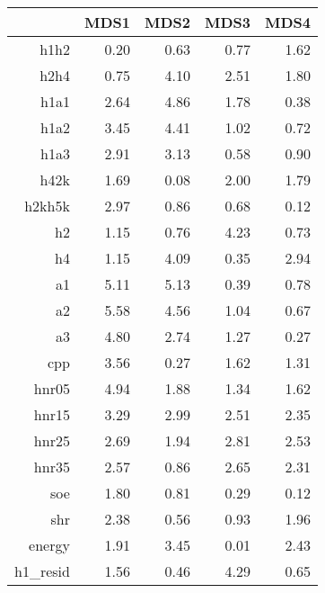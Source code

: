 \begin{table}[ht]
\centering
\begin{tabular}{rrrrr}
  \hline
 & MDS1 & MDS2 & MDS3 & MDS4 \\ 
  \hline
h1h2 & 0.20 & 0.63 & 0.77 & 1.62 \\ 
  h2h4 & 0.75 & 4.10 & 2.51 & 1.80 \\ 
  h1a1 & 2.64 & 4.86 & 1.78 & 0.38 \\ 
  h1a2 & 3.45 & 4.41 & 1.02 & 0.72 \\ 
  h1a3 & 2.91 & 3.13 & 0.58 & 0.90 \\ 
  h42k & 1.69 & 0.08 & 2.00 & 1.79 \\ 
  h2kh5k & 2.97 & 0.86 & 0.68 & 0.12 \\ 
  h2 & 1.15 & 0.76 & 4.23 & 0.73 \\ 
  h4 & 1.15 & 4.09 & 0.35 & 2.94 \\ 
  a1 & 5.11 & 5.13 & 0.39 & 0.78 \\ 
  a2 & 5.58 & 4.56 & 1.04 & 0.67 \\ 
  a3 & 4.80 & 2.74 & 1.27 & 0.27 \\ 
  cpp & 3.56 & 0.27 & 1.62 & 1.31 \\ 
  hnr05 & 4.94 & 1.88 & 1.34 & 1.62 \\ 
  hnr15 & 3.29 & 2.99 & 2.51 & 2.35 \\ 
  hnr25 & 2.69 & 1.94 & 2.81 & 2.53 \\ 
  hnr35 & 2.57 & 0.86 & 2.65 & 2.31 \\ 
  soe & 1.80 & 0.81 & 0.29 & 0.12 \\ 
  shr & 2.38 & 0.56 & 0.93 & 1.96 \\ 
  energy & 1.91 & 3.45 & 0.01 & 2.43 \\ 
  h1\_resid & 1.56 & 0.46 & 4.29 & 0.65 \\ 
   \hline
\end{tabular}
\end{table}
